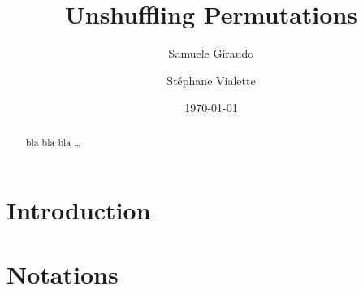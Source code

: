\documentclass[a4paper,10pt]{llncs}
\DeclareMathOperator{\STD}{\mathrm{std}}
\begin{document}

\title{%
Unshuffling Permutations}%

\author{%
  Samuele Giraudo \and
  St\'ephane Vialette
}%
\date{\today}

\maketitle


\begin{abstract}
bla bla bla \ldots
\end{abstract}


\section{Introduction}
\label{section:Introduction}



\section{Notations}
\label{section:Notations}



\end{document}
